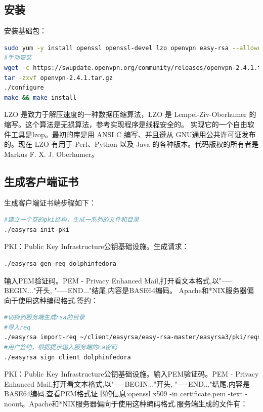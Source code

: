 \documentclass[letter]{book}
\begin{document}
\subsection{安装}

安装基础包：

\begin{lstlisting}[language=bash]
sudo yum -y install openssl openssl-devel lzo openvpn easy-rsa --allowerasing
#手动安装
wget -c https://swupdate.openvpn.org/community/releases/openvpn-2.4.1.tar.gz
tar -zxvf openvpn-2.4.1.tar.gz
./configure
make && make install
\end{lstlisting}

LZO 是致力于解压速度的一种数据压缩算法，LZO 是 Lempel-Ziv-Oberhumer 的缩写。这个算法是无损算法，参考实现程序是线程安全的。 实现它的一个自由软件工具是lzop。最初的库是用 ANSI C 编写、并且遵从 GNU通用公共许可证发布的。现在 LZO 有用于 Perl、Python 以及 Java 的各种版本。代码版权的所有者是 Markus F. X. J. Oberhumer。

\subsection{生成客户端证书}

生成客户端证书端步骤如下：

\begin{lstlisting}[language=Bash]
#建立一个空的pki结构，生成一系列的文件和目录
./easyrsa init-pki
\end{lstlisting}

PKI：Public Key Infrastructure公钥基础设施。生成请求：

\begin{lstlisting}[language=Bash]
./easyrsa gen-req dolphinfedora
\end{lstlisting}

输入PEM验证码。PEM - Privacy Enhanced Mail,打开看文本格式,以"-----BEGIN..."开头, "-----END..."结尾,内容是BASE64编码。
Apache和*NIX服务器偏向于使用这种编码格式.签约：

\begin{lstlisting}[language=Bash]
#切换到服务端生成rsa的目录
#导入req
./easyrsa import-req ~/client/easyrsa/easy-rsa-master/easyrsa3/pki/reqs/dolphinfedora.req dolphinfedora
#用户签约，根据提示输入服务端的ca密码
./easyrsa sign client dolphinfedora
\end{lstlisting}

PKI：Public Key Infrastructure公钥基础设施。输入PEM验证码。PEM - Privacy Enhanced Mail,打开看文本格式,以"-----BEGIN..."开头, "-----END..."结尾,内容是BASE64编码.查看PEM格式证书的信息:openssl x509 -in certificate.pem -text -noout。Apache和*NIX服务器偏向于使用这种编码格式.服务端生成的文件有：
\end{document}
